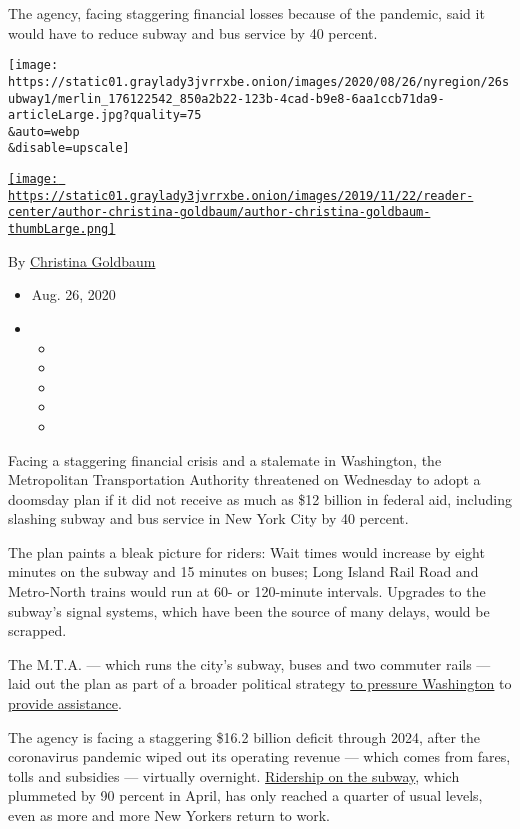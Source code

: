 The agency, facing staggering financial losses because of the pandemic,
said it would have to reduce subway and bus service by 40 percent.

\texttt{[image: https://static01.graylady3jvrrxbe.onion/images/2020/08/26/nyregion/26subway1/merlin\_176122542\_850a2b22-123b-4cad-b9e8-6aa1ccb71da9-articleLarge.jpg?quality=75\\\&auto=webp\\\&disable=upscale]}

\href{https://www.nytimes3xbfgragh.onion/by/christina-goldbaum}{\texttt{[image: https://static01.graylady3jvrrxbe.onion/images/2019/11/22/reader-center/author-christina-goldbaum/author-christina-goldbaum-thumbLarge.png]}}

By
\href{https://www.nytimes3xbfgragh.onion/by/christina-goldbaum}{Christina
Goldbaum}

\begin{itemize}
\item
  Aug. 26, 2020
\item
  \begin{itemize}
  \item
  \item
  \item
  \item
  \item
  \end{itemize}
\end{itemize}

Facing a staggering financial crisis and a stalemate in Washington, the
Metropolitan Transportation Authority threatened on Wednesday to adopt a
doomsday plan if it did not receive as much as \$12 billion in federal
aid, including slashing subway and bus service in New York City by 40
percent.

The plan paints a bleak picture for riders: Wait times would increase by
eight minutes on the subway and 15 minutes on buses; Long Island Rail
Road and Metro-North trains would run at 60- or 120-minute intervals.
Upgrades to the subway's signal systems, which have been the source of
many delays, would be scrapped.

The M.T.A. --- which runs the city's subway, buses and two commuter
rails --- laid out the plan as part of a broader political strategy
\href{https://www.nytimes3xbfgragh.onion/2020/07/21/nyregion/mta-subway-financial-cuts.html}{to
pressure Washington} to
\href{https://www.nytimes3xbfgragh.onion/2020/04/20/nyregion/nyc-mta-subway-coronavirus.html}{provide
assistance}.

The agency is facing a staggering \$16.2 billion deficit through 2024,
after the coronavirus pandemic wiped out its operating revenue --- which
comes from fares, tolls and subsidies --- virtually overnight.
\href{https://www.nytimes3xbfgragh.onion/2020/03/24/nyregion/coronavirus-nyc-mta-cuts-.html}{Ridership
on the subway}, which plummeted by 90 percent in April, has only reached
a quarter of usual levels, even as more and more New Yorkers return to
work.

